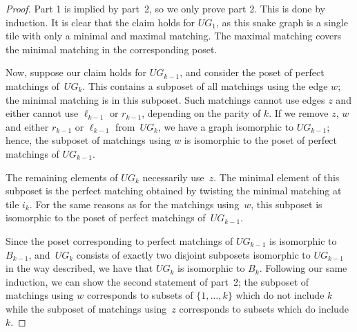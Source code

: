 \documentclass[11pt]{article}
\numberwithin{equation}{section}
\begin{document}
\begin{proof}Part 1 is implied by part~2, so we only prove part 2. This is done by induction. It is clear that the claim holds for $UG_1$, as this snake graph is a single tile with only a minimal and maximal matching. The maximal matching covers the minimal matching in the corresponding poset.

Now, suppose our claim holds for $UG_{k-1}$, and consider the poset of perfect matchings of~$UG_k$. This contains a subposet of all matchings using the edge $w$; the minimal matching is in this subposet. Such matchings cannot use edges $z$ and either cannot use $\ell_{k-1}$ or $r_{k-1}$, depending on the parity of $k$. If we remove $z$, $w$ and either $r_{k-1}$ or $\ell_{k-1}$ from~$UG_k$, we have a graph isomorphic to $UG_{k-1}$; hence, the subposet of matchings using $w$ is isomorphic to the poset of perfect matchings of $UG_{k-1}$.

The remaining elements of $UG_{k}$ necessarily use~$z$. The minimal element of this subposet is the perfect matching obtained by twisting the minimal matching at tile $i_k$. For the same reasons as for the matchings using~$w$, this subposet is isomorphic to the poset of perfect matchings of~$UG_{k-1}$.

 Since the poset corresponding to perfect matchings of $UG_{k-1}$ is isomorphic to~$B_{k-1}$, and~$UG_k$ consists of exactly two disjoint subposets isomorphic to $UG_{k-1}$ in the way described, we have that $UG_k$ is isomorphic to $B_k$. Following our same induction, we can show the second statement of part~2; the subposet of matchings using $w$ corresponds to subsets of $\{1,\ldots, k\}$ which do not include $k$ while the subposet of matchings using~$z$ corresponds to subsets which do include~$k$.
\end{proof}
\end{document}
